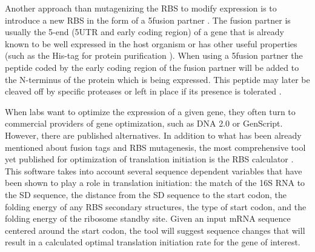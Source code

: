 Another approach than mutagenizing the RBS to modify expression is to introduce
a new RBS in the form of a 5\ppp fusion partner \cite{lavallie_gene_1995}. The
fusion partner is usually the 5\ppp-end (5\ppp UTR and early coding region) of
a gene that is already known to be well expressed in the host organism or has
other useful properties (such as the His-tag for protein purification
\cite{cebe_rapid_2006}). When using a 5\ppp fusion partner the peptide coded by
the early coding region of the fusion partner will be added to the N-terminus
of the protein which is being expressed. This peptide may later be cleaved off
by specific proteases or left in place if its presence is tolerated
\cite{esposito_enhancement_2006}.

When labs want to optimize the expression of a given gene, they often turn to
commercial providers of gene optimization, such as DNA 2.0 or GenScript.
However, there are published alternatives. In addition to what has been already
mentioned about fusion tags and RBS mutagenesis, the most comprehensive tool
yet published for optimization of translation initiation is the RBS calculator
\cite{salis_automated_2009}. This software takes into account several sequence
dependent variables that have been shown to play a role in translation
initiation: the match of the 16S RNA to the SD sequence, the distance from the
SD sequence to the start codon, the folding energy of any RBS secondary
structures, the type of start codon, and the folding energy of the ribosome
standby site. Given an input mRNA sequence centered around the start codon, the
tool will suggest sequence changes that will result in a calculated optimal
translation initiation rate for the gene of interest.


